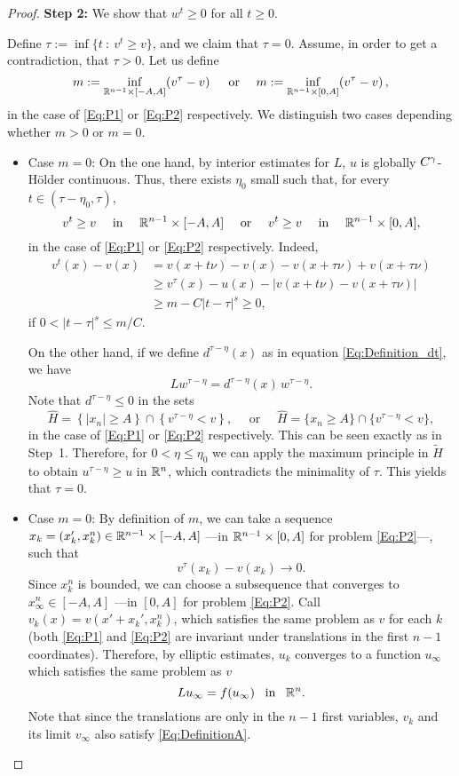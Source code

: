 \begin{proof}
\textbf{Step 2:} We show that $w^t\geq 0$ for all $t\geq 0$.

Define $\tau := \inf \{t \ : \ v^t\geq v\}$, and we claim that $\tau=0$. Assume, in order to get a contradiction, that $\tau>0$. Let us define
$$ 
m := \inf_{\mathbb{R}^{n-1}\times [-A,A]} (v^\tau - v)\, \quad \text{ or } \quad
m := \inf_{\mathbb{R}^{n-1}\times [0,A]} (v^\tau - v) \,,
$$
in the case of \eqref{Eq:P1} or \eqref{Eq:P2} respectively. We distinguish two cases depending whether $m>0$ or $m=0$.
\begin{itemize}
\item Case $m=0$:
On the one hand, by interior estimates  for $L$, $u$ is globally $C^\gamma$-H\"older continuous. Thus, there exists $\eta_0$ small such that, for every  $t\in(\tau-\eta_0,\tau)$,
$$ 
v^t\geq v \quad \textrm{ in } \quad  \mathbb{R}^{n-1}\times [-A,A] 
\quad \text{ or } \quad  
v^t\geq v \quad \textrm{ in } \quad  \mathbb{R}^{n-1}\times [0,A], 
$$
in the case of \eqref{Eq:P1} or \eqref{Eq:P2} respectively. Indeed,
\begin{align*}
v^t(x)-v(x) &= v(x+t\nu)-v(x)-v(x+\tau\nu)+v(x+\tau\nu) \\
& \geq v^\tau(x)-u(x) - |v(x+t\nu)-v(x+\tau\nu)| \\
& \geq m - C|t-\tau|^s \geq 0,
\end{align*}
if $0 < |t-\tau|^s\leq m/C$.

On the other hand, if we define $d^{\tau-\eta}(x)$ as in equation \eqref{Eq:Definition_dt}, we have
$$ L w^{\tau-\eta} = d^{\tau-\eta} (x) \,w^{\tau-\eta}. $$
Note that $d^{\tau-\eta}\leq 0$ in the sets
$$ 
\hat{H} = \left\{|x_n|\geq A\right\} \cap \left\{v^{\tau-\eta}<v\right\},   \quad  \textrm{ or }  \quad  
\hat{H} = \{x_n\geq A\} \cap \{v^{\tau-\eta}<v\},
$$
in the case of \eqref{Eq:P1} or \eqref{Eq:P2} respectively. This can be seen exactly as in Step~1. Therefore, for $0<\eta \leq \eta_0$ we can apply the maximum principle in $\tilde{H}$ to obtain $u^{\tau-\eta} \geq u$ in $\mathbb{R}^n$, which contradicts the minimality of $\tau$. This yields that $\tau = 0$.

\item Case $m=0$: By definition of $m$, we can take a sequence $x_k= (x_k',x_k^n) \in \mathbb{R}^{n-1}\times[-A,A]$ ---in $\mathbb{R}^{n-1}\times[0,A]$ for problem \eqref{Eq:P2}---, such that
\begin{equation}
\label{Eq:Limit}
v^\tau(x_k) - v(x_k) \rightarrow 0.
\end{equation}
Since $x_k^n$ is bounded, we can choose a subsequence that converges to $x_\infty^n \in [-A,A]$ ---in $[0,A]$ for problem \eqref{Eq:P2}.
Call $v_k(x) = v(x'+x_k',x_k^n)$, which satisfies the same problem as $v$ for each $k$ (both \eqref{Eq:P1} and \eqref{Eq:P2} are invariant under translations in the first $n-1$ coordinates). Therefore, by elliptic estimates, $u_k$ converges to a function $u_\infty$ which satisfies the same problem as $v$ 
$$ L u_\infty = f(u_\infty) \,\,\, \text{ in } \,\,\, \mathbb{R}^n. $$
Note that since the translations are only in the $n-1$ first variables, $v_k$ and its limit $v_\infty$ also satisfy \eqref{Eq:DefinitionA}. 


\end{itemize}
\end{proof}
